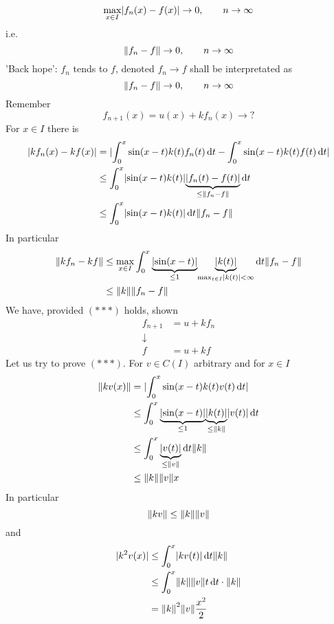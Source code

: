 \begin{enumerate}[1.]
	\[
		\max_{x \in I}\lvert f_n(x)-f(x)\rvert \to 0, \qquad n \to \infty
	\]
	i.e.
	\[
		\norm{f_n -f} \to 0, \qquad n \to \infty
	\]
	'Back hope':
	$f_n$ tends to $f$, denoted $f_n \to f$ shall be interpretated as
	\[
		\norm{f_n -f} \to 0, \qquad n \to \infty
	\]
	Remember
	\[
		f_{n+1}(x) = u(x) + k f_n(x) \to ?
	\]
	For $x \in I$ there is
	\begin{align*}
		\abs{k f_n(x)- kf(x)} &= \abs{ \int_{0}^{x} \sin(x-t)k(t)f_n(t) \,\mathrm{d}t- \int_{0}^{x}\sin(x-t)k(t)f(t) \,\mathrm{d}t} \\
		&\leq \int_{0}^{x}\abs{\sin(x-t)k(t)}\underset{\leq \norm{f_n-f}}{\underbrace{\abs{f_n(t)-f(t)}}} \,\mathrm{d}t \\
		&\leq \int_{0}^{x}\abs{\sin(x-t)k(t)} \,\mathrm{d}t \norm{f_n-f}
	\end{align*}
	In particular
	\begin{align*}
		\norm{k f_n- kf} &\leq \max_{x \in I}\int_{0}^{x} \underset{\leq 1}{\underbrace{\abs{\sin(x-t)}}} \underset{\max_{t \in I}\abs{k(t)}< \infty}{\underbrace{\abs{k(t)}}} \,\mathrm{d}t \norm{f_n -f} \\
		&\leq \norm{k} \norm{f_n-f}
	\end{align*}
	We have, provided $(***)$ holds, shown
	\begin{align*}
		f_{n+1} &= u + k f_n \\
		\downarrow & \\
		f &= u + kf
	\end{align*}
	Let us try to prove $(***)$. For $v \in C(I)$ arbitrary and for $x \in I$
	\begin{align*}
		\norm{kv(x)} &= \abs{\int_{0}^{x}\sin(x-t)k(t)v(t) \,\mathrm{d}t} \\
		&\leq \int_{0}^{x}\underset{\leq 1}{\underbrace{\abs{\sin(x-t)}}}\underset{\leq \norm{k}}{\underbrace{\abs{k(t)}}}\abs{v(t)} \,\mathrm{d}t \\
		&\leq \int_{0}^{x}\underset{\leq \norm{v}}{\underbrace{\abs{v(t)}}} \,\mathrm{d}t \norm{k} \\
		&\leq \norm{k} \norm{v}x
	\end{align*}
	In particular
	\[
		\norm{kv} \leq \norm{k}\norm{v}
	\]
	and
	\begin{align*}
		\abs{k^2v(x)} &\leq \int_{0}^{x} \abs{kv(t)} \,\mathrm{d}t \norm{k} \\
		&\leq \int_{0}^{x}\norm{k}\norm{v}t \,\mathrm{d}t \cdot \norm{k} \\
		&= \norm{k}^2 \norm{v} \frac{x^2}{2}
	\end{align*}

\end{enumerate}
